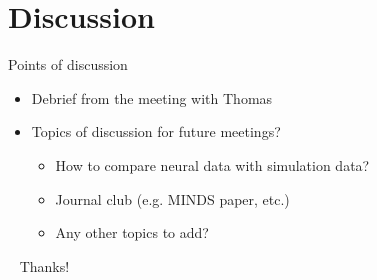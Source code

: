 \documentclass[bigger]{beamer}
\begin{document}
\section{Discussion}
\label{sec:orgf6c4291}
\begin{frame}[<+->][label={sec:org2549330}]{Points of discussion}
\begin{itemize}
\item Debrief from the meeting with Thomas
\item Topics of discussion for future meetings?
\begin{itemize}
\item How to compare neural data with simulation data?
\item Journal club (e.g. MINDS paper, etc.)
\item Any other topics to add?
\end{itemize}
\end{itemize}
\end{frame}
\begin{frame}[label={sec:org7cf9124},standout]{~}
Thanks!
\end{frame}
\end{document}
